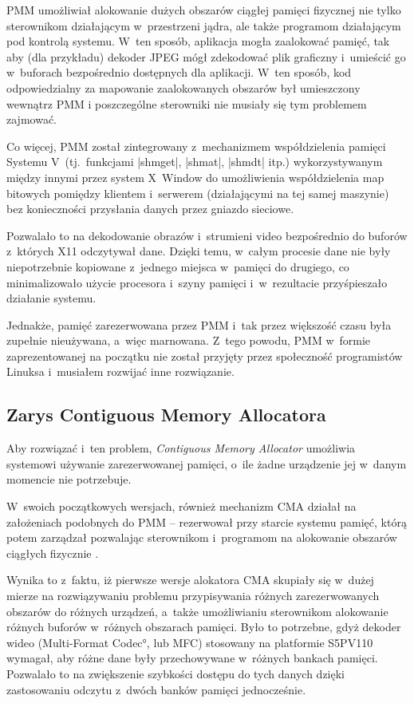 PMM umożliwiał alokowanie dużych obszarów ciągłej pamięci fizycznej
nie tylko sterownikom działającym w~przestrzeni jądra, ale także
programom działającym pod kontrolą systemu.  W~ten sposób, aplikacja
mogła zaalokować pamięć, tak aby (dla przykładu) dekoder JPEG mógł
zdekodować plik graficzny i~umieścić go w~buforach bezpośrednio
dostępnych dla aplikacji.  W~ten sposób, kod odpowiedzialny za
mapowanie zaalokowanych obszarów był umieszczony wewnątrz PMM
i poszczególne sterowniki nie musiały się tym problemem zajmować.

Co więcej, PMM został zintegrowany z~mechanizmem współdzielenia
pamięci Systemu V~(tj.\ funkcjami \code|shmget|, \code|shmat|,
\code|shmdt| itp.) wykorzystywanym między innymi przez system X~Window
do umożliwienia współdzielenia map bitowych pomiędzy klientem
i~serwerem (działającymi na tej samej maszynie) bez konieczności
przysłania danych przez gniazdo sieciowe.

Pozwalało to na dekodowanie obrazów i~strumieni video bezpośrednio do
buforów z~których X11 odczytywał dane.  Dzięki temu, w~całym procesie
dane nie były niepotrzebnie kopiowane z~jednego miejsca w~pamięci do
drugiego, co minimalizowało użycie procesora i~szyny pamięci
i~w~rezultacie przyśpieszało działanie systemu.

Jednakże, pamięć zarezerwowana przez PMM i~tak przez większość czasu
była zupełnie nieużywana, a~więc marnowana.  Z~tego powodu, PMM
w~formie zaprezentowanej na początku nie został przyjęty przez
społeczność programistów Linuksa i~musiałem rozwijać inne rozwiązanie.

\subsection{Zarys Contiguous Memory Allocatora}

Aby rozwiązać i~ten problem, {\it Contiguous Memory Allocator}
umożliwia systemowi używanie zarezerwowanej pamięci, o~ile żadne
urządzenie jej w~danym momencie nie potrzebuje.

W~swoich początkowych wersjach, również mechanizm CMA działał na
założeniach podobnych do PMM -- rezerwował przy starcie systemu
pamięć, którą potem zarządzał pozwalając sterownikom i~programom na
alokowanie obszarów ciągłych fizycznie \autocite{patch:cma-4}.

Wynika to z~faktu, iż pierwsze wersje alokatora CMA skupiały się
w~dużej mierze na rozwiązywaniu problemu przypisywania różnych
zarezerwowanych obszarów do różnych urządzeń, a~także umożliwianiu
sterownikom alokowanie różnych buforów w~różnych obszarach pamięci.
Było to potrzebne, gdyż dekoder wideo (\ang{Multi-Format Codec}, lub
MFC) stosowany na platformie S5PV110 wymagał, aby różne dane były
przechowywane w~różnych bankach pamięci.  Pozwalało to na zwiększenie
szybkości dostępu do tych danych dzięki zastosowaniu odczytu z~dwóch
banków pamięci jednocześnie.

